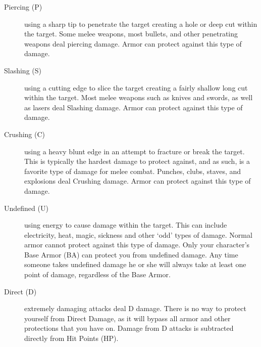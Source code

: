 \documentclass[twoside]{book}
\begin{document}
\begin{description}
    
  \item[ Piercing (P) ] 
    {  
     using a sharp tip to penetrate the target
                   creating a hole or deep cut within the target. Some
                   melee weapons, most bullets, and other penetrating
                   weapons deal piercing damage. Armor can protect
                   against this type of damage. 
    }
  
  \item[ Slashing (S) ] 
    {  
     using a cutting edge to slice the target
                   creating a fairly shallow long cut within the target.
                   Most melee weapons such as knives and swords, as well
                   as lasers deal Slashing damage. Armor can protect
                   against this type of damage. 
    }
  
  \item[ Crushing (C) ] 
    {  
     using a heavy blunt edge in an attempt to
                   fracture or break the target. This is typically the
                   hardest damage to protect against, and as such, is a
                   favorite type of damage for melee combat. Punches,
                   clubs, staves, and explosions deal Crushing damage.
                   Armor can protect against this type of damage. 
    }
  
  \item[ Undefined (U) ] 
    {  
     using energy to cause damage within the target.
                   This can include electricity, heat, magic, sickness
                   and other `odd' types of damage. Normal
                   armor cannot protect against this type of damage. Only
                   your character's Base Armor (BA) can protect you
                   from undefined damage. Any time someone takes
                   undefined damage he or she will always take at least
                   one point of damage, regardless of the Base Armor.
                   
    }
  
  \item[ Direct (D) ] 
    {  
     extremely damaging attacks deal D damage. There
                   is no way to protect yourself from Direct Damage, as
                   it will bypass all armor and other protections that
                   you have on. Damage from D attacks is subtracted
                   directly from Hit Points (HP). 
    }
  
\end{description}
  
\end{document}
